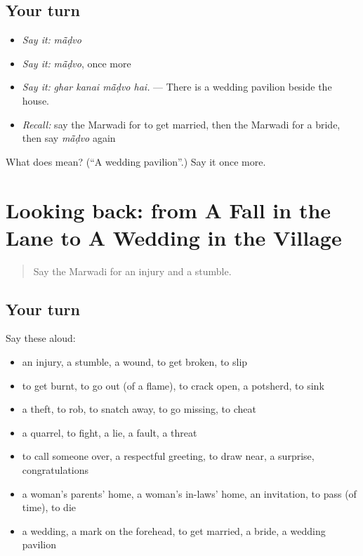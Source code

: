 \subsection*{Your turn}
\begin{itemize}
\raggedright
  \item \emph{Say it:} \emph{mā̃ḍvo}
  \item \emph{Say it:} \emph{mā̃ḍvo}, once more
  \item \emph{Say it:} \emph{ghar kanai mā̃ḍvo hai.} — There is a wedding pavilion beside the house.
  \item \emph{Recall:} say the Marwadi for to get married, then the Marwadi for a bride, then say \emph{mā̃ḍvo} again
\end{itemize}

\begin{tcolorbox}[breakable,colback=teal!4,colframe=teal!35!black,title={Before you move on}]
What does  mean? (\textquotedblleft{}A wedding pavilion\textquotedblright{}.) Say it once more.
\end{tcolorbox}
\section[(dialogue)]{Looking back: from A Fall in the Lane to A Wedding in the Village}

\label{lesson:MW-R247-review-241-247}



\begin{quote}
Say the Marwadi for an injury and a stumble.
\end{quote}

\subsection*{Your turn}
Say these aloud:

\begin{itemize}
\raggedright
  \item an injury, a stumble, a wound, to get broken, to slip
  \item to get burnt, to go out (of a flame), to crack open, a potsherd, to sink
  \item a theft, to rob, to snatch away, to go missing, to cheat
  \item a quarrel, to fight, a lie, a fault, a threat
  \item to call someone over, a respectful greeting, to draw near, a surprise, congratulations
  \item a woman's parents' home, a woman's in-laws' home, an invitation, to pass (of time), to die
  \item a wedding, a mark on the forehead, to get married, a bride, a wedding pavilion
\end{itemize}

